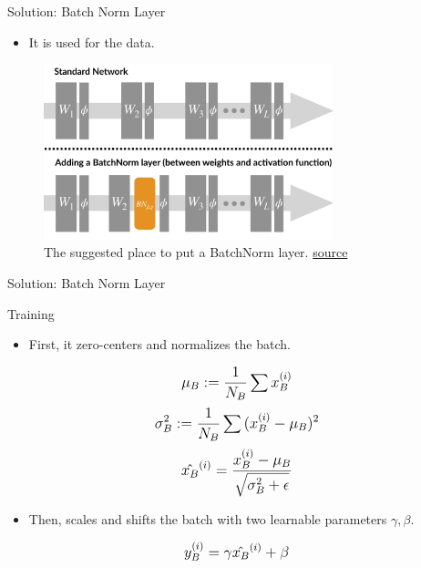 \begin{frame}{Solution: Batch Norm Layer}
	\begin{itemize}
		\item It is used for  the data.
	\end{itemize}
	\begin{figure}[H]
		\centering
		\includegraphics[width=0.75\textwidth]{Figs/section_4/batchnorm_2.jpg}
		\caption{The suggested place to put a BatchNorm layer. \href{https://gradientscience.org/batchnorm/}{source}}
	\end{figure}
\end{frame}
\begin{frame}{Solution: Batch Norm Layer}
	\begin{block}{Training}
		\begin{itemize}
			\item First, it zero-centers and normalizes the batch.
		\end{itemize}
		\begin{equation*}
			\mathlarger{
				\mu_B := \frac{1}{N_B} \sum{x_B^{(i)}}
			}
		\end{equation*}
		\begin{equation*}
			\mathlarger{
				\sigma_B^2 := \frac{1}{N_B} \sum{(x_B^{(i)} - \mu_B)^2}
			}
		\end{equation*}
		\begin{equation*}
			\mathlarger{
				\hat{x_B}^{(i)} = \frac{x_B^{(i)} - \mu_B}{\sqrt{\sigma^2_B + \epsilon}}
			}
		\end{equation*}
		\begin{itemize}
			\item Then, scales and shifts the batch with two learnable parameters $\gamma, \beta$.
		\end{itemize}
		\begin{equation*}
			\mathlarger{
				y_B^{(i)} = \gamma \hat{x_B}^{(i)} + \beta	
			}
		\end{equation*}
	\end{block}
\end{frame}
